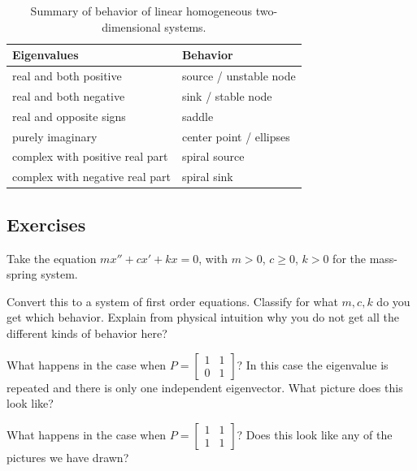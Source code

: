 \begin{table}[h!t]
\mybeginframe
\capstart
\begin{center}
\begin{tabular}{@{}ll@{}}
\toprule
Eigenvalues & Behavior \\
\midrule
real and both positive & source / unstable node \\
real and both negative & sink / stable node \\
real and opposite signs & saddle \\
purely imaginary & center point / ellipses \\
complex with positive real part & spiral source \\
complex with negative real part & spiral sink \\
\bottomrule
\end{tabular}
\end{center}
\caption{Summary of behavior of linear homogeneous two-dimensional systems.\label{pln:behtab}}
\myendframe
\end{table}

\subsection{Exercises}

\begin{exercise}
Take the equation $m x'' + c x' + kx = 0$, with $m > 0$, $c \geq 0$, $k > 0$
for the mass-spring system.
\begin{tasks}
\task Convert this to a system of first
order equations.
\task Classify for what $m, c, k$ do you get which behavior.
\task Explain from physical intuition why you do not get all the
different kinds of behavior here?
\end{tasks}
\end{exercise}

\begin{exercise}
\pagebreak[2]
What happens in the case when $P = 
\left[ \begin{smallmatrix} 1 & 1 \\ 0 & 1 \end{smallmatrix} \right]$?  In
this case the eigenvalue is repeated and there is only one independent eigenvector.
What
picture does this look like?
\end{exercise}

\begin{exercise}
What happens in the case when $P = 
\left[ \begin{smallmatrix} 1 & 1 \\ 1 & 1 \end{smallmatrix} \right]$?
Does this look like any of the pictures we have drawn?
\end{exercise}


